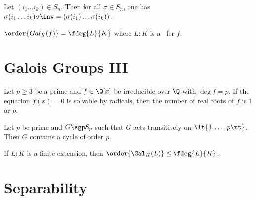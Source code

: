\documentclass{article}
\begin{document}
\begin{tlemma}
  Let \( (i_1\ldots i_k)\in S_n \).
  Then for all \( \sigma\in S_n \), one has \( \sigma(i_1\ldots i_k)\sigma\inv = (\sigma(i_1)\ldots\sigma(i_k)) \).
\end{tlemma}

\quad \( \order{Gal_K(f)} = \fdeg{L}{K} \) where \( L:K \) is a \sfe~for \( f \).

\section{Galois Groups III}
\begin{ttheorem}[Kronecker]
  Let \( p \geq 3 \) be a prime and \( f\in \Q[x] \) be irreducible over \( \Q \) with \( \deg f = p \).
  If the equation \( f(x) = 0 \) is solvable by radicals, then the number of real roots of \( f \) is 1 or \( p \).
\end{ttheorem}

\begin{tlemma}
  Let \( p \) be prime and \( G\sgp S_p \) such that \( G \) acts transitively on \( \lt\{ 1,\ldots,p \rt\} \).
  Then \( G \) contains a cycle of order \( p \).
\end{tlemma}

\begin{ttheorem}
  If \( L:K \) is a finite extension, then \( \order{\Gal_K(L)} \leq \fdeg{L}{K} \).
\end{ttheorem}

\section{Separability}
\end{document}
